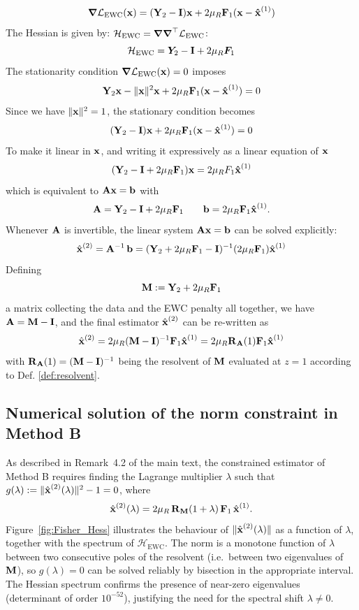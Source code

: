 \documentclass[11pt]{article}
\begin{document}
\begin{rem}
\[
 \boldsymbol{\mathbf{\nabla}} \mathcal L_{\mathrm{EWC}}(\boldsymbol{\mathbf{x}})= (\boldsymbol{\mathbf{Y}}_2 - \boldsymbol{\mathbf{I}}) \boldsymbol{\mathbf{x}}+2\mu_R \boldsymbol{\mathbf{F}}_1(\boldsymbol{\mathbf{x}} - \boldsymbol{\mathbf{\hat x}}^{(1)})
\]
The Hessian is given by: $\mathcal{H_{\text{EWC}}}= \boldsymbol{\mathbf{\nabla}} \boldsymbol{\mathbf{\nabla}} ^\top \mathcal{L_{\mathrm{EWC}}}$:
\[
    \mathcal{H_{\text{EWC}}} = \bm{Y}_2 - \boldsymbol{\mathbf{I}}  + 2 \mu_R \bm{F}_1
\]
The stationarity condition $\boldsymbol{\mathbf{\nabla}} \mathcal L_{\mathrm{EWC}}(\boldsymbol{\mathbf{x}})= 0$ imposes
\[
    \boldsymbol{\mathbf{Y}}_2 \boldsymbol{\mathbf{x}} - \| \boldsymbol{\mathbf{x}}\|^2  \boldsymbol{\mathbf{x}}  +2\mu_R \boldsymbol{\mathbf{F}}_1(\boldsymbol{\mathbf{x}} - \boldsymbol{\mathbf{\hat x}}^{(1)}) = 0
\]
Since we have $\| \boldsymbol{\mathbf{x}}\|^2 = 1$, the stationary condition becomes
\[
(\boldsymbol{\mathbf{Y}}_2 - \boldsymbol{\mathbf{I}}) \boldsymbol{\mathbf{x}}+2\mu_R \boldsymbol{\mathbf{F}}_1(\boldsymbol{\mathbf{x}} - \boldsymbol{\mathbf{\hat x}}^{(1)}) = 0
\]
To make it linear in $\boldsymbol{\mathbf{x}}$, and  writing it expressively as a linear equation of $\boldsymbol{\mathbf{x}}$
\[
(\boldsymbol{\mathbf{Y}}_2 - \boldsymbol{\mathbf{I}} + 2 \mu_R \boldsymbol{\mathbf{F}}_1) \boldsymbol{\mathbf{x}}=2 \mu_RF_1\boldsymbol{\mathbf{\hat x}}^{(1)}
\]
which is equivalent to $\boldsymbol{\mathbf{A}} \boldsymbol{\mathbf{x}} = \boldsymbol{\mathbf{b}}$
with
\[
    \boldsymbol{\mathbf{A}} =
    \boldsymbol{\mathbf{Y}}_2 -\boldsymbol{\mathbf{I}} + 2\mu_R \boldsymbol{\mathbf{F}}_1
    \qquad
    \boldsymbol{\mathbf{b}}
    =
    2\mu_R \boldsymbol{\mathbf{F}}_1\boldsymbol{\mathbf{\hat x}}^{(1)}.
\]
Whenever $\boldsymbol{\mathbf{A}}$ is invertible, the linear system $\boldsymbol{\mathbf{A}} \boldsymbol{\mathbf{x}}=\boldsymbol{\mathbf{b}}$ can be solved explicitly:
\[
    \hat{\boldsymbol{\mathbf{x}}}^{(2)}
    =
    \boldsymbol{\mathbf{A}}^{-1}\,\boldsymbol{\mathbf{b}}
    =
    (\boldsymbol{\mathbf{Y}}_2 + 2\mu_R \boldsymbol{\mathbf{F}}_1 - \boldsymbol{\mathbf{I}})^{-1}(2\mu_R \boldsymbol{\mathbf{F}}_1) \hat{\boldsymbol{\mathbf{x}}}^{(1)}
\]
Defining
\[
    \boldsymbol{\mathbf{M}} :=\boldsymbol{\mathbf{Y}}_2 + 2\mu_R \boldsymbol{\mathbf{F}}_1
\]
a matrix collecting the data and the EWC penalty all together, we have $\boldsymbol{\mathbf{A}} =\boldsymbol{\mathbf{M}} - \boldsymbol{\mathbf{I}}$, and the final estimator $\hat{\boldsymbol{\mathbf{x}}}^{(2)}$ can be re-written as
\[
\hat{\boldsymbol{\mathbf{x}}}^{(2)} = 2\mu_R(\boldsymbol{\mathbf{M}} - \boldsymbol{\mathbf{I}})^{-1}\boldsymbol{\mathbf{F}}_1 \boldsymbol{\mathbf{\hat x}}^{(1)} = 2\mu_R \boldsymbol{\mathbf{R}}_{\boldsymbol{\mathbf{A}}}(1)\boldsymbol{\mathbf{F}}_1 \boldsymbol{\mathbf{\hat x}}^{(1)}
\]
with $\boldsymbol{\mathbf{R}}_{\boldsymbol{\mathbf{A}}}(1) = (\boldsymbol{\mathbf{M}} - \boldsymbol{\mathbf{I}}) ^{-1}$ being the resolvent of $\boldsymbol{\mathbf{M}}$ evaluated at $z = 1$ according to Def. \ref{def:resolvent}.






\subsection{Numerical solution of the norm constraint in Method B}
\label{adix:lambda}

As described in Remark~4.2 of the main text, the constrained estimator of Method B requires finding the Lagrange multiplier $\lambda$ such that $g(\lambda) := \|\hat{\boldsymbol{\mathbf{x}}}^{(2)}(\lambda)\|^2 - 1 = 0$, where
\[
    \hat{\boldsymbol{\mathbf{x}}}^{(2)}(\lambda) = 2\mu_R\,\boldsymbol{\mathbf{R}}_{\boldsymbol{\mathbf{M}}}(1+\lambda)\,\boldsymbol{\mathbf{F}}_1\,\hat{\boldsymbol{\mathbf{x}}}^{(1)}.
\]
Figure~\ref{fig:Fisher_Hess} illustrates the behaviour of $\|\hat{\boldsymbol{\mathbf{x}}}^{(2)}(\lambda)\|$ as a function of $\lambda$, together with the spectrum of $\mathcal{H}_{\mathrm{EWC}}$. The norm is a monotone function of $\lambda$ between two consecutive poles of the resolvent (i.e.\ between two eigenvalues of $\boldsymbol{\mathbf{M}}$), so $g(\lambda)=0$ can be solved reliably by bisection in the appropriate interval. The Hessian spectrum confirms the presence of near-zero eigenvalues (determinant of order $10^{-52}$), justifying the need for the spectral shift $\lambda \neq 0$.


\end{rem}
\end{document}
